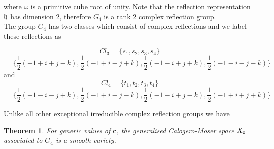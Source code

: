 \documentclass[a4apper,10pt]{amsart}
\newtheorem{thm}{Theorem}
\theoremstyle{definition}
\numberwithin{thm}{section}
\begin{document}
\noindent where $\omega$ is a primitive cube root of unity. Note that
the reflection representation $\frak{h}$ has dimension $2$, therefore
$G_4$ is a rank $2$ complex reflection group. \\

\noindent The group $G_4$ has two classes which consist of complex reflections and we label
these reflections as 

\begin{displaymath}
Cl_3 = \{s_1,s_2,s_3,s_4 \}
\end{displaymath}
\begin{displaymath}
= \{ \frac{1}{2}(-1 + i + j - k), \frac{1}{2}(-1 + i - j + k),
\frac{1}{2}(-1 - i + j + k), \frac{1}{2}(-1 - i - j - k) \}
\end{displaymath}
\noindent and 
\begin{displaymath}
Cl_4 = \{t_1,t_2,t_3,t_4 \}
\end{displaymath}
\begin{displaymath}
= \{\frac{1}{2}(-1 - i - j + k) , \frac{1}{2}(-1 + i - j - k),
\frac{1}{2}(-1 - i + j - k), \frac{1}{2}(-1 + i + j + k)\}
\end{displaymath}

\noindent Unlike all other exceptional irreducible complex reflection groups we have

\begin{thm}\label{thm:G4}
For generic values of $\mathbf{c}$, the generalised Calogero-Moser space $X_{\bf{c}}$ associated to $G_4$ is a smooth variety.
\end{thm}
\end{document}
